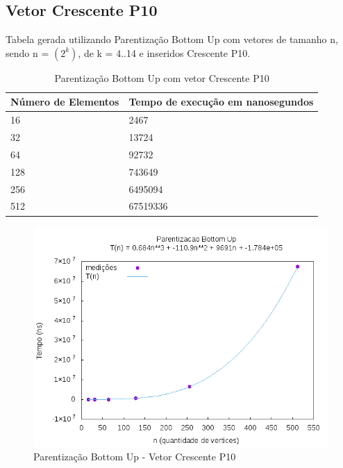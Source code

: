\documentclass[12pt,a4paper,twoside]{report}
\begin{document}
\subsection{Vetor Crescente P10}
Tabela gerada utilizando Parentização Bottom Up com vetores de tamanho n, sendo n = $(2^k)$, de k = 4..14 e inseridos Crescente P10.
\begin{table}[H]
\centering
\caption{Parentização Bottom Up com vetor Crescente P10}
\label{my-label}
\begin{tabular}{|l|l|}
\hline
\multicolumn{1}{|c|}{\textbf{Número de Elementos}} & \multicolumn{1}{c|}{\textbf{Tempo de execução em nanosegundos}} \\ \hline
16 & 2467 \\ \hline
32 & 13724 \\ \hline
64 & 92732 \\ \hline
128 & 743649 \\ \hline
256 & 6495094 \\ \hline
512 & 67519336 \\ \hline
\end{tabular}
\end{table}

\begin{figure}[H]
    \centering
    \includegraphics[width=0.7\linewidth]{graficos/Parentizacao BottomUp/Crescente P10/ParentizacaoBottomUp.png}
  \caption{Parentização Bottom Up - Vetor Crescente P10}
\end{figure}
\end{document}
